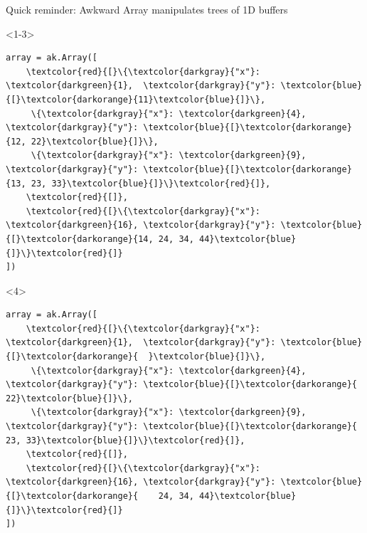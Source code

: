 \documentclass[aspectratio=169]{beamer}
\begin{document}
\begin{frame}[fragile]{Quick reminder: Awkward Array manipulates trees of 1D buffers}
\vspace{0.5 cm}

\begin{onlyenv}<1-3>
\begin{Verbatim}[commandchars=\\\{\}]
array = ak.Array([
    \textcolor{red}{[}\{\textcolor{darkgray}{"x"}: \textcolor{darkgreen}{1},  \textcolor{darkgray}{"y"}: \textcolor{blue}{[}\textcolor{darkorange}{11}\textcolor{blue}{]}\},
     \{\textcolor{darkgray}{"x"}: \textcolor{darkgreen}{4},  \textcolor{darkgray}{"y"}: \textcolor{blue}{[}\textcolor{darkorange}{12, 22}\textcolor{blue}{]}\},
     \{\textcolor{darkgray}{"x"}: \textcolor{darkgreen}{9},  \textcolor{darkgray}{"y"}: \textcolor{blue}{[}\textcolor{darkorange}{13, 23, 33}\textcolor{blue}{]}\}\textcolor{red}{]},
    \textcolor{red}{[]},
    \textcolor{red}{[}\{\textcolor{darkgray}{"x"}: \textcolor{darkgreen}{16}, \textcolor{darkgray}{"y"}: \textcolor{blue}{[}\textcolor{darkorange}{14, 24, 34, 44}\textcolor{blue}{]}\}\textcolor{red}{]}
])
\end{Verbatim}
\end{onlyenv}\begin{onlyenv}<4>
\begin{Verbatim}[commandchars=\\\{\}]
array = ak.Array([
    \textcolor{red}{[}\{\textcolor{darkgray}{"x"}: \textcolor{darkgreen}{1},  \textcolor{darkgray}{"y"}: \textcolor{blue}{[}\textcolor{darkorange}{  }\textcolor{blue}{]}\},
     \{\textcolor{darkgray}{"x"}: \textcolor{darkgreen}{4},  \textcolor{darkgray}{"y"}: \textcolor{blue}{[}\textcolor{darkorange}{    22}\textcolor{blue}{]}\},
     \{\textcolor{darkgray}{"x"}: \textcolor{darkgreen}{9},  \textcolor{darkgray}{"y"}: \textcolor{blue}{[}\textcolor{darkorange}{    23, 33}\textcolor{blue}{]}\}\textcolor{red}{]},
    \textcolor{red}{[]},
    \textcolor{red}{[}\{\textcolor{darkgray}{"x"}: \textcolor{darkgreen}{16}, \textcolor{darkgray}{"y"}: \textcolor{blue}{[}\textcolor{darkorange}{    24, 34, 44}\textcolor{blue}{]}\}\textcolor{red}{]}
])
\end{Verbatim}
\end{onlyenv}


\end{frame}
\end{document}
